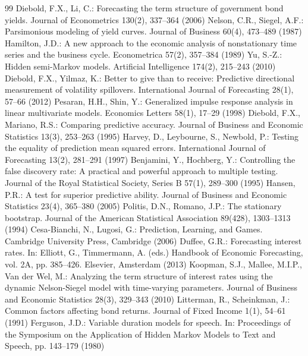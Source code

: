 \documentclass[10pt]{article}
\begin{document}
\begin{thebibliography}{99}
 Diebold, F.X., Li, C.: Forecasting the term structure of government bond yields. Journal of Econometrics 130(2), 337--364 (2006)
 Nelson, C.R., Siegel, A.F.: Parsimonious modeling of yield curves. Journal of Business 60(4), 473--489 (1987)
 Hamilton, J.D.: A new approach to the economic analysis of nonstationary time series and the business cycle. Econometrica 57(2), 357--384 (1989)
 Yu, S.-Z.: Hidden semi-Markov models. Artificial Intelligence 174(2), 215--243 (2010)
 Diebold, F.X., Yilmaz, K.: Better to give than to receive: Predictive directional measurement of volatility spillovers. International Journal of Forecasting 28(1), 57--66 (2012)
 Pesaran, H.H., Shin, Y.: Generalized impulse response analysis in linear multivariate models. Economics Letters 58(1), 17--29 (1998)
 Diebold, F.X., Mariano, R.S.: Comparing predictive accuracy. Journal of Business and Economic Statistics 13(3), 253--263 (1995)
 Harvey, D., Leybourne, S., Newbold, P.: Testing the equality of prediction mean squared errors. International Journal of Forecasting 13(2), 281--291 (1997)
 Benjamini, Y., Hochberg, Y.: Controlling the false discovery rate: A practical and powerful approach to multiple testing. Journal of the Royal Statistical Society, Series B 57(1), 289--300 (1995)
 Hansen, P.R.: A test for superior predictive ability. Journal of Business and Economic Statistics 23(4), 365--380 (2005)
 Politis, D.N., Romano, J.P.: The stationary bootstrap. Journal of the American Statistical Association 89(428), 1303--1313 (1994)
 Cesa-Bianchi, N., Lugosi, G.: Prediction, Learning, and Games. Cambridge University Press, Cambridge (2006)
 Duffee, G.R.: Forecasting interest rates. In: Elliott, G., Timmermann, A. (eds.) Handbook of Economic Forecasting, vol. 2A, pp. 385--426. Elsevier, Amsterdam (2013)
 Koopman, S.J., Mallee, M.I.P., Van der Wel, M.: Analyzing the term structure of interest rates using the dynamic Nelson-Siegel model with time-varying parameters. Journal of Business and Economic Statistics 28(3), 329--343 (2010)
 Litterman, R., Scheinkman, J.: Common factors affecting bond returns. Journal of Fixed Income 1(1), 54--61 (1991)
 Ferguson, J.D.: Variable duration models for speech. In: Proceedings of the Symposium on the Application of Hidden Markov Models to Text and Speech, pp. 143--179 (1980)

\end{thebibliography}
\end{document}
